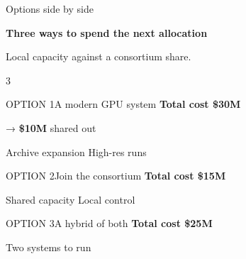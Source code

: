 \documentclass[aspectratio=\engineaspectratio]{beamer}
\begin{document}
\begin{frame}{Options side by side}
  \begin{enginelead}
    \textbf{Three ways to spend the next allocation}\par
    Local capacity against a consortium share.
  \end{enginelead}
  \begin{enginecards}{3}
    \begin{enginecard}[pick]{OPTION 1}{A modern GPU system}
      \textbf{Total cost \$30M}
      \begin{enginestrip}[role=accent]
        → \textbf{\$10M} shared out
      \end{enginestrip}
      \begin{enginestatus}
        \done Archive expansion
        \warn High-res runs
      \end{enginestatus}
    \end{enginecard}
    \begin{enginecard}{OPTION 2}{Join the consortium}
      \textbf{Total cost \$15M}
      \begin{enginestatus}
        \done Shared capacity
        \fail Local control
      \end{enginestatus}
    \end{enginecard}
    \begin{enginecard}{OPTION 3}{A hybrid of both}
      \textbf{Total cost \$25M}
      \begin{enginestatus}
        \warn Two systems to run
      \end{enginestatus}
    \end{enginecard}
  \end{enginecards}
\end{frame}
\end{document}

